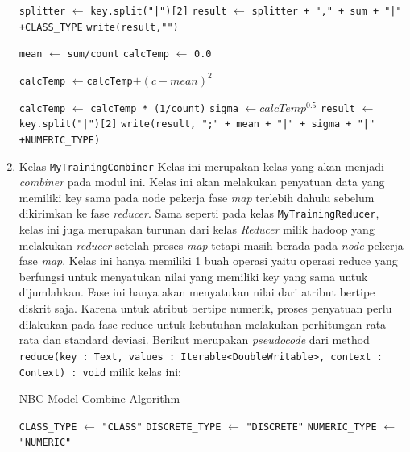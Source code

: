 \begin{enumerate}
\begin{algorithm}[H]
\begin{algorithmic}[1]
\State \texttt{splitter} $\gets$ \texttt{key.split("|")[2]}
\State \texttt{result} $\gets$ \texttt{splitter + "," + sum + "|" +}\verb|CLASS_TYPE|
\State \texttt{write(result,"")}


\State \texttt{mean} $\gets$ \texttt{sum/count}
\State \texttt{calcTemp} $\gets$ \texttt{0.0}

	\State \texttt{calcTemp} $\gets$\texttt{calcTemp}$+(c - mean)^2$
\EndFor

\State \texttt{calcTemp} $\gets$ \texttt{calcTemp * (1/count)}
\State \texttt{sigma} $\gets calcTemp^{0.5}$
\State \texttt{result} $\gets$  \texttt{key.split("|")[2]}
\State \texttt{write(result, ";" + mean + "|" + sigma + "|" +}\verb|NUMERIC_TYPE|\texttt{)}

\EndIf

\EndProcedure
\end{algorithmic}
\end{algorithm}

\item Kelas \texttt{MyTrainingCombiner}
Kelas ini merupakan kelas yang akan menjadi \textit{combiner} pada modul ini. Kelas ini akan melakukan penyatuan data yang memiliki key sama pada node pekerja fase \textit{map} terlebih dahulu sebelum dikirimkan ke fase \textit{reducer}. Sama seperti pada kelas \texttt{MyTrainingReducer}, kelas ini juga merupakan turunan dari kelas \textit{Reducer} milik hadoop yang melakukan \textit{reducer} setelah proses \textit{map} tetapi masih berada pada \textit{node} pekerja fase \textit{map}. Kelas ini hanya memiliki 1 buah operasi yaitu operasi reduce yang berfungsi untuk menyatukan nilai yang memiliki key yang sama untuk dijumlahkan. Fase ini hanya akan menyatukan nilai dari atribut bertipe diskrit saja. Karena untuk atribut bertipe numerik, proses penyatuan perlu dilakukan pada fase reduce untuk kebutuhan melakukan perhitungan rata - rata dan standard deviasi. Berikut merupakan \textit{pseudocode} dari method \texttt{reduce(key : Text, values : Iterable<DoubleWritable>, context : Context) : void} milik kelas ini:

\begin{algorithm}[H]
\caption{NBC Model Combine Algorithm}\label{alg:NBCGenCombine}
\begin{algorithmic}[1]

\State \verb|CLASS_TYPE| $\gets$ \texttt{"CLASS"}
\State \verb|DISCRETE_TYPE| $\gets$ \texttt{"DISCRETE"}
\State \verb|NUMERIC_TYPE| $\gets$ \texttt{"NUMERIC"}


\end{algorithmic}
\end{algorithm}
\end{enumerate}
